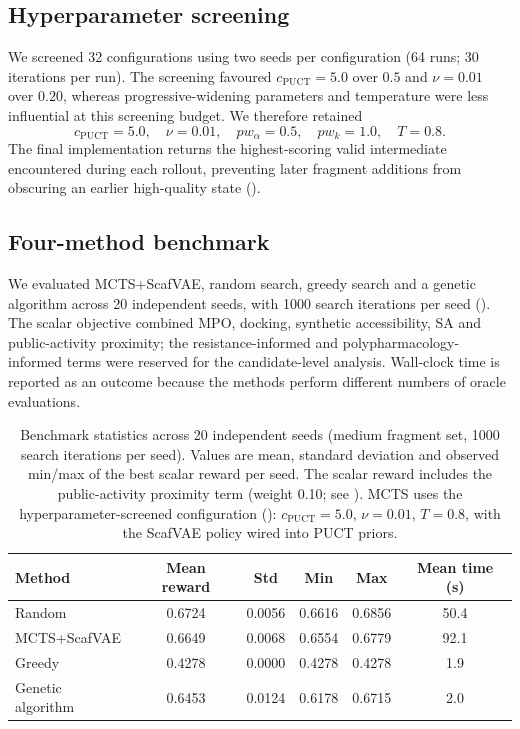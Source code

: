 \documentclass[10pt,a4paper]{article}
\begin{document}
\subsection{Hyperparameter screening}
\label{sec:hparam}

We screened \num{32} configurations using two seeds per configuration (\num{64} runs; \num{30} iterations per run). The screening favoured $c_{\text{PUCT}}=\num{5.0}$ over $\num{0.5}$ and $\nu=\num{0.01}$ over $\num{0.20}$, whereas progressive-widening parameters and temperature were less influential at this screening budget. We therefore retained
\[
c_{\text{PUCT}}=\num{5.0},\quad
\nu=\num{0.01},\quad
pw_{\alpha}=\num{0.5},\quad
pw_{k}=\num{1.0},\quad
T=\num{0.8}.
\]
The final implementation returns the highest-scoring valid intermediate encountered during each rollout, preventing later fragment additions from obscuring an earlier high-quality state ().

\subsection{Four-method benchmark}
\label{sec:benchmark}

We evaluated MCTS+ScafVAE, random search, greedy search and a genetic algorithm across \num{20} independent seeds, with \num{1000} search iterations per seed (). The scalar objective combined MPO, docking, synthetic accessibility, SA and public-activity proximity; the resistance-informed and polypharmacology-informed terms were reserved for the candidate-level analysis. Wall-clock time is reported as an outcome because the methods perform different numbers of oracle evaluations.

\begin{table}[htbp]
  \centering
  \caption{Benchmark statistics across \num{20} independent seeds (medium fragment set, \num{1000} search iterations per seed). Values are mean, standard deviation and observed min/max of the best scalar reward per seed. The scalar reward includes the public-activity proximity term (weight \num{0.10}; see ). MCTS uses the hyperparameter-screened configuration (): $c_{\text{PUCT}}=\num{5.0}$, $\nu=\num{0.01}$, $T=\num{0.8}$, with the ScafVAE policy wired into PUCT priors.}
  \label{tab:benchmark}
  \begin{tabular}{lccccc}
    \toprule
    Method & Mean reward & Std & Min & Max & Mean time (s) \\
    \midrule
    Random        & \num{0.6724} & \num{0.0056} & \num{0.6616} & \num{0.6856} & \num{50.4} \\
    MCTS+ScafVAE  & \num{0.6649} & \num{0.0068} & \num{0.6554} & \num{0.6779} & \num{92.1} \\
    Greedy        & \num{0.4278} & \num{0.0000} & \num{0.4278} & \num{0.4278} & \num{1.9} \\
    Genetic algorithm & \num{0.6453} & \num{0.0124} & \num{0.6178} & \num{0.6715} & \num{2.0} \\
    \bottomrule
  \end{tabular}
\end{table}
\end{document}
